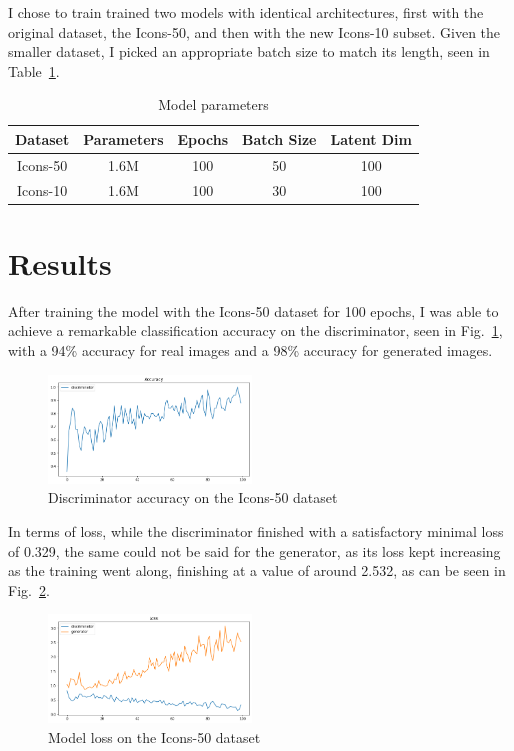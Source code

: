 \documentclass[conference]{IEEEtran}
\begin{document}
I chose to train trained two models with identical architectures, first with the original dataset, the Icons-50, and then with the new Icons-10 subset. Given the smaller dataset, I picked an appropriate batch size to match its length, seen in Table~\ref{tab:ModelParams}.

\begin{table}[htbp]
    \centering
    \caption{Model parameters}
    \begin{tabular}{ccccc}
    \hline
    \textbf{Dataset} & \textbf{Parameters} & \textbf{Epochs} & \textbf{Batch Size} & \textbf{Latent Dim} \\ \hline
    Icons-50 & 1.6M & 100 & 50 & 100 \\
    Icons-10 & 1.6M & 100 & 30 & 100 \\ \hline
    \end{tabular}
    \label{tab:ModelParams}
\end{table}

\section{Results}

After training the model with the Icons-50 dataset for 100 epochs, I was able to achieve a remarkable classification accuracy on the discriminator, seen in Fig.~\ref{fig:Icons50Acc}, with a 94\% accuracy for real images and a 98\% accuracy for generated images.

\begin{figure}[htbp]
    \centering
    \includegraphics[width=0.48\textwidth]{paper/images/icons50/icons50_acc.png}
    \caption{Discriminator accuracy on the Icons-50 dataset}
    \label{fig:Icons50Acc}
\end{figure}

In terms of loss, while the discriminator finished with a satisfactory minimal loss of 0.329, the same could not be said for the generator, as its loss kept increasing as the training went along, finishing at a value of around 2.532, as can be seen in Fig.~\ref{fig:Icons50Loss}.

\begin{figure}[htbp]
    \centering
    \includegraphics[width=0.48\textwidth]{paper/images/icons50/icons50_loss.png}
    \caption{Model loss on the Icons-50 dataset}
    \label{fig:Icons50Loss}
\end{figure}
\end{document}
